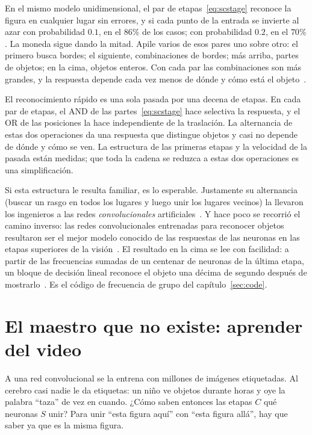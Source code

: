 En el mismo modelo unidimensional, el par de etapas~\eqref{eq:scstage} reconoce la figura en cualquier lugar sin errores, y si cada punto de la entrada se invierte al azar con probabilidad $0.1$, en el $86\%$ de los casos; con probabilidad $0.2$, en el $70\%$. La moneda sigue dando la mitad. Apile varios de esos pares uno sobre otro: el primero busca bordes; el siguiente, combinaciones de bordes; más arriba, partes de objetos; en la cima, objetos enteros. Con cada par las combinaciones son más grandes, y la respuesta depende cada vez menos de dónde y cómo está el objeto~\cite{Riesenhuber1999}.

\begin{keyblock}
\begin{proposition}
\label{prop:conveyor}
El reconocimiento rápido es una sola pasada por una decena de etapas. En cada par de etapas, el AND de las partes~\eqref{eq:scstage} hace selectiva la respuesta, y el OR de las posiciones la hace independiente de la traslación. La alternancia de estas dos operaciones da una respuesta que distingue objetos y casi no depende de dónde y cómo se ven. La estructura de las primeras etapas y la velocidad de la pasada están medidas; que toda la cadena se reduzca a estas dos operaciones es una simplificación.
\end{proposition}
\end{keyblock}

Si esta estructura le resulta familiar, es lo esperable. Justamente su alternancia (buscar un rasgo en todos los lugares y luego unir los lugares vecinos) la llevaron los ingenieros a las redes \emph{convolucionales} artificiales~\cite{Fukushima1980}. Y hace poco se recorrió el camino inverso: las redes convolucionales entrenadas para reconocer objetos resultaron ser el mejor modelo conocido de las respuestas de las neuronas en las etapas superiores de la visión~\cite{Yamins2014}. El resultado en la cima se lee con facilidad: a partir de las frecuencias sumadas de un centenar de neuronas de la última etapa, un bloque de decisión lineal reconoce el objeto una décima de segundo después de mostrarlo~\cite{Hung2005}. Es el código de frecuencia de grupo del capítulo~\ref{sec:code}.

\section{El maestro que no existe: aprender del video}

A una red convolucional se la entrena con millones de imágenes etiquetadas. Al cerebro casi nadie le da etiquetas: un niño ve objetos durante horas y oye la palabra “taza” de vez en cuando. ¿Cómo saben entonces las etapas $C$ qué neuronas $S$ unir? Para unir “esta figura aquí” con “esta figura allá”, hay que saber ya que es la misma figura.

